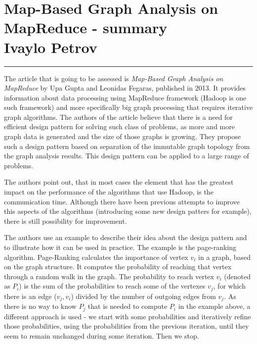\documentclass[12pt]{article}
\newcommand{\hr}{\rule{\linewidth}{0.1mm}}
\theoremstyle{plain}
\begin{document}
\section*{\centering
  Map-Based Graph Analysis on MapReduce - summary \\
  Ivaylo Petrov 
}

\hr

The article that is going to be assessed is \emph{Map-Based Graph Analysis on
MapReduce} by Upa Gupta and Leonidas Fegaras, published in 2013. It provides
information about data processing using MapReduce framework (Hadoop is one such
framework) and more specifically big graph processing that requires iterative
graph algorithms. The authors of the article believe that there is a need for
efficient design pattern for solving such class of problems, as more and more
graph data is generated and the size of those graphs is growing. They propose
such a design pattern based on separation of the immutable graph topology from
the graph analysis results. This design pattern can be applied to a large range
of problems.  

  The authors point out, that in most cases the element that has the greatest
  impact on the performance of the algorithms that use Hadoop, is the
  communication time. Although there have been previous attempts to improve
  this aspects of the algorithms (introducing some new design patters for
  example), there is still possibility for improvement.  

  The authors use an example to describe their idea about the design pattern
  and to illustrate how it can be used in practice. The example is the
  page-ranking algorithm. Page-Ranking calculates the importance of vertex
  $v_i$ in a graph, based on the graph structure. It computes the probability
  of reaching that vertex through a random walk in the graph. The probability
  to reach vertex $v_i$ (denoted as $P_i$) is the sum of the probabilities to
  reach some of the vertexes $v_j$, for which there is an edge ($v_j, v_i$)
  divided by the number of outgoing edges from $v_j$. As there is no way to
  know $P_j$ that is needed to compute $P_i$ in the example above, a different
  approach is used - we start with some probabilities and iteratively refine
  those probabilities, using the probabilities from the previous iteration,
  until they seem to remain unchanged during some iteration. Then we stop.
  
\end{document}
